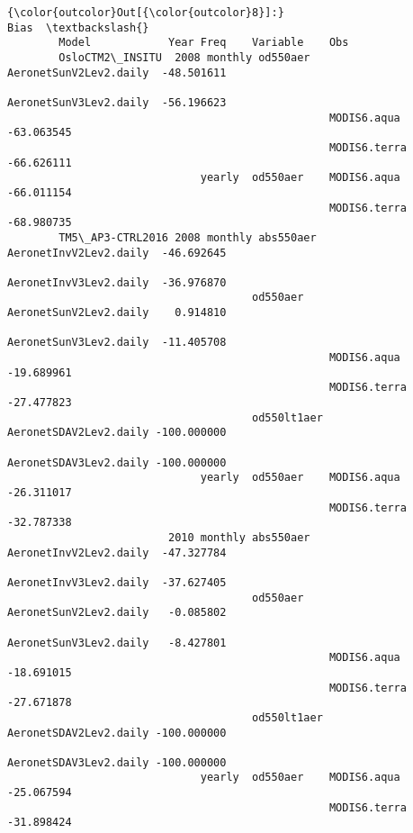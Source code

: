 \documentclass[11pt]{article}
\begin{document}
\begin{Verbatim}[commandchars=\\\{\}]
{\color{outcolor}Out[{\color{outcolor}8}]:}                                                                         Bias  \textbackslash{}
        Model            Year Freq    Variable    Obs                                  
        OsloCTM2\_INSITU  2008 monthly od550aer    AeronetSunV2Lev2.daily  -48.501611   
                                                  AeronetSunV3Lev2.daily  -56.196623   
                                                  MODIS6.aqua             -63.063545   
                                                  MODIS6.terra            -66.626111   
                              yearly  od550aer    MODIS6.aqua             -66.011154   
                                                  MODIS6.terra            -68.980735   
        TM5\_AP3-CTRL2016 2008 monthly abs550aer   AeronetInvV2Lev2.daily  -46.692645   
                                                  AeronetInvV3Lev2.daily  -36.976870   
                                      od550aer    AeronetSunV2Lev2.daily    0.914810   
                                                  AeronetSunV3Lev2.daily  -11.405708   
                                                  MODIS6.aqua             -19.689961   
                                                  MODIS6.terra            -27.477823   
                                      od550lt1aer AeronetSDAV2Lev2.daily -100.000000   
                                                  AeronetSDAV3Lev2.daily -100.000000   
                              yearly  od550aer    MODIS6.aqua             -26.311017   
                                                  MODIS6.terra            -32.787338   
                         2010 monthly abs550aer   AeronetInvV2Lev2.daily  -47.327784   
                                                  AeronetInvV3Lev2.daily  -37.627405   
                                      od550aer    AeronetSunV2Lev2.daily   -0.085802   
                                                  AeronetSunV3Lev2.daily   -8.427801   
                                                  MODIS6.aqua             -18.691015   
                                                  MODIS6.terra            -27.671878   
                                      od550lt1aer AeronetSDAV2Lev2.daily -100.000000   
                                                  AeronetSDAV3Lev2.daily -100.000000   
                              yearly  od550aer    MODIS6.aqua             -25.067594   
                                                  MODIS6.terra            -31.898424   

\end{Verbatim}
\end{document}
